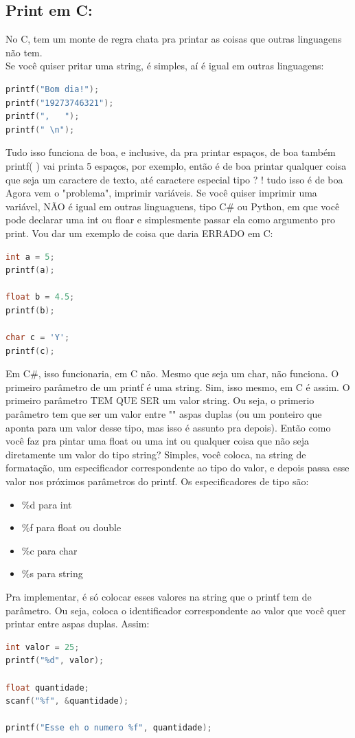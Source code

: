 \documentclass{article}
\begin{document}
\subsection{Print em C:} No C, tem um monte de regra chata pra printar as coisas que outras linguagens não tem. 
\\[5pt]
Se você quiser pritar uma string, é simples, aí é igual em outras linguagens:
\begin{lstlisting}[language=C]
printf("Bom dia!");
printf("19273746321");
printf(",   ");
printf(" \n");
\end{lstlisting}
Tudo isso funciona de boa, e inclusive, da pra printar espaços, de boa também printf(     ) vai printa 5 espaços, por exemplo, então é de boa printar qualquer coisa que seja um caractere de texto, até caractere especial tipo ? ! tudo isso é de boa
\\[5pt]
Agora vem o "problema", imprimir variáveis. Se você quiser imprimir uma variável, NÃO é igual em outras linguaguens, tipo C\# ou Python, em que você pode declarar uma int ou floar e simplesmente passar ela como argumento pro print. Vou dar um exemplo de coisa que daria ERRADO em C:
\begin{lstlisting}[language=C]
int a = 5;
printf(a);

float b = 4.5;
printf(b);

char c = 'Y';
printf(c);
\end{lstlisting}
Em C\#, isso funcionaria, em C não. Mesmo que seja um char, não funciona. O primeiro parâmetro de um printf é uma string. Sim, isso mesmo, em C é assim. O primeiro parâmetro TEM QUE SER um valor string. Ou seja, o primerio parâmetro tem que ser um valor entre "" aspas duplas (ou um ponteiro que aponta para um valor desse tipo, mas isso é assunto pra depois). Então como você faz pra pintar uma float ou uma int ou qualquer coisa que não seja diretamente um valor do tipo string? Simples, você coloca, na string de formatação, um especificador correspondente ao tipo do valor, e depois passa esse valor nos próximos parâmetros do printf. Os especificadores de tipo são: 
\begin{itemize}
    \item \%d para int
    \item \%f para float ou double
    \item \%c para char
    \item \%s para string
\end{itemize}
Pra implementar, é só colocar esses valores na string que o printf tem de parâmetro. Ou seja, coloca o identificador correspondente ao valor que você quer printar entre aspas duplas. Assim:
\begin{lstlisting}[language=C]
int valor = 25;
printf("%d", valor);

float quantidade;
scanf("%f", &quantidade);

printf("Esse eh o numero %f", quantidade);
\end{lstlisting}
\end{document}
